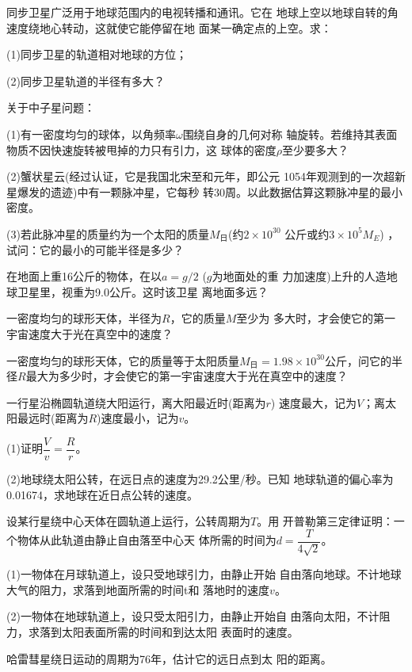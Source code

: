 \begin{exercises}
\exercise 同步卫星广泛用于地球范围内的电视转播和通讯。它在
地球上空以地球自转的角速度绕地心转动，这就使它能停留在地
面某一确定点的上空。求：

(1)同步卫星的轨道相对地球的方位；

(2)同步卫星轨道的半径有多大？

\exercise 关于中子星问题：

(1)有一密度均匀的球体，以角频率$ \omega $围绕自身的几何对称
轴旋转。若维持其表面物质不因快速旋转被甩掉的力只有引力，这
球体的密度$ \rho $至少要多大？

(2)蟹状星云(经过认证，它是我国北宋至和元年，即公元
1054年观测到的一次超新星爆发的遗迹)中有一颗脉冲星，它每秒
转30周。以此数据估算这颗脉冲星的最小密度。

(3)若此脉冲星的质量约为一个太阳的质量$ M _ \text{日} $(约$  2 \times 1 0 ^ { 3 0 }  $
公斤或约$  3 \times 1 0 ^ { 5 } M _ { E }  $)  ，试问：它的最小的可能半径是多少？

\exercise 在地面上重16公斤的物体，在以$  a = g / 2 $ ($ g $为地面处的重
力加速度)上升的人造地球卫星里，视重为9.0公斤。这时该卫星
离地面多远？

\exercise 一密度均匀的球形天体，半径为$ R $，它的质量$ M $至少为
多大时，才会使它的第一宇宙速度大于光在真空中的速度？

\exercise 一密度均匀的球形天体，它的质量等于太阳质量$ M _ \text{日} =
1. 9 8 \times 1 0 ^ { 3 0 }  $公斤，问它的半径$ R $最大为多少时，才会使它的第一宇宙速度大于光在真空中的速度？

\exercise 一行星沿椭圆轨道绕大阳运行，离大阳最近时(距离为$ r $)
速度最大，记为$ V $；离太阳最远时(距离为$ R $)速度最小，记为$ v $。

(1)证明$ \dfrac { V } { v } = \dfrac { R } { r }   $。

(2)地球绕太阳公转，在远日点的速度为29.2公里/秒。已知
地球轨道的偏心率为0.01674，求地球在近日点公转的速度。

\exercise 设某行星绕中心天体在圆轨道上运行，公转周期为$ T $。用
开普勒第三定律证明：一个物体从此轨道由静止自由落至中心天
体所需的时间为$d = \dfrac { T } { 4 \sqrt { 2 } } $。

\exercise (1)一物体在月球轨道上，设只受地球引力，由静止开始
自由落向地球。不计地球大气的阻力，求落到地面所需的时间t和
落地时的速度$ v $。

(2)一物体在地球轨道上，设只受太阳引力，由静止开始自
由落向太阳，不计阻力，求落到太阳表面所需的时间和到达太阳
表面时的速度。

\exercise 哈雷彗星绕日运动的周期为76年，估计它的远日点到太
阳的距离。

\end{exercises}